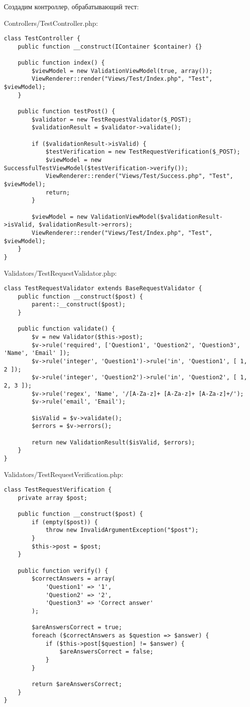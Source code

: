 \documentclass[a4paper,14pt]{extarticle}
\begin{document}
Создадим контроллер, обрабатывающий тест:

Controllers/TestController.php:
\begin{lstlisting}
class TestController {
    public function __construct(IContainer $container) {}

    public function index() {
        $viewModel = new ValidationViewModel(true, array());
        ViewRenderer::render("Views/Test/Index.php", "Test", $viewModel);
    }

    public function testPost() {
        $validator = new TestRequestValidator($_POST);
        $validationResult = $validator->validate();

        if ($validationResult->isValid) {
            $testVerification = new TestRequestVerification($_POST);
            $viewModel = new SuccessfulTestViewModel($testVerification->verify());
            ViewRenderer::render("Views/Test/Success.php", "Test", $viewModel);
            return;
        }

        $viewModel = new ValidationViewModel($validationResult->isValid, $validationResult->errors);
        ViewRenderer::render("Views/Test/Index.php", "Test", $viewModel);
    }
}
\end{lstlisting}

Validators/TestRequestValidator.php:
\begin{lstlisting}
class TestRequestValidator extends BaseRequestValidator {
    public function __construct($post) {
        parent::__construct($post);
    }

    public function validate() {
        $v = new Validator($this->post);
        $v->rule('required', ['Question1', 'Question2', 'Question3', 'Name', 'Email' ]);
        $v->rule('integer', 'Question1')->rule('in', 'Question1', [ 1, 2 ]);
        $v->rule('integer', 'Question2')->rule('in', 'Question2', [ 1, 2, 3 ]);
        $v->rule('regex', 'Name', '/[A-Za-z]+ [A-Za-z]+ [A-Za-z]+/');
        $v->rule('email', 'Email');

        $isValid = $v->validate();
        $errors = $v->errors();

        return new ValidationResult($isValid, $errors);
    }
}
\end{lstlisting}

Validators/TestRequestVerification.php:
\begin{lstlisting}
class TestRequestVerification {
    private array $post;

    public function __construct($post) {
        if (empty($post)) {
            throw new InvalidArgumentException("$post");
        }
        $this->post = $post;
    }

    public function verify() {
        $correctAnswers = array(
            'Question1' => '1',
            'Question2' => '2',
            'Question3' => 'Correct answer'
        );

        $areAnswersCorrect = true;
        foreach ($correctAnswers as $question => $answer) {
            if ($this->post[$question] != $answer) {
                $areAnswersCorrect = false;
            }
        }

        return $areAnswersCorrect;
    }
}
\end{lstlisting}
\end{document}
